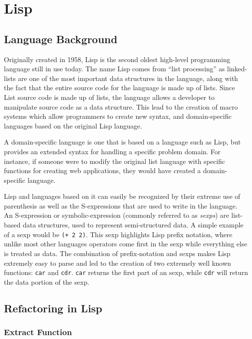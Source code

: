 \section{Lisp}

\subsection{Language Background}

Originally created in 1958, Lisp is the second oldest high-level programming language still in use today. The name Lisp comes from ``list processing'' as linked-lists are one of the most important data structures in the language, along with the fact that the entire source code for the language is made up of lists. Since List source code is made up of lists, the language allows a developer to manipulate source code as a data structure. This lead to the creation of macro systems which allow programmers to create new syntax, and domain-specific languages based on the original Lisp language\cite{evolutionoflisp}.

A domain-specific language is one that is based on a language such as Lisp, but provides an extended syntax for handling a specific problem domain. For instance, if someone were to modify the original list language with specific functions for creating web applications, they would have created a domain-specific language\cite{domainspecific}.

Lisp and languages based on it can easily be recognized by their extreme use of parenthesis as well as the S-expressions that are used to write in the language. An S-expression or symbolic-expression (commonly referred to as \textit{sexps}) are list-based data structures, used to represent semi-structured data. A simple example of a sexp would be \verb!(+ 2 2)!. This sexp highlights Lisp prefix notation, where unlike most other languages operators come first in the sexp while everything else is treated as data. The combination of prefix-notation and sexps makes Lisp extremely easy to parse and led to the creation of two extremely well known functions: \verb!car! and \verb!cdr!. \verb!car! returns the first part of an sexp, while \verb!cdr! will return the data portion of the sexp.


\subsection{Refactoring in Lisp}

\subsubsection{Extract Function}

